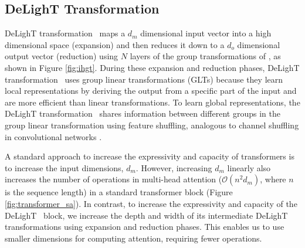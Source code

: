 \subsection{DeLighT Transformation}
\label{ssec:dextra}
DeLighT transformation ~maps a  $d_m$ dimensional input vector into a high dimensional space (expansion) and then reduces it down to a  $d_o$ dimensional output vector (reduction) using  $N$ layers of the group transformations of \citet{mehta2018pyramidal}, as shown in Figure \ref{fig:ihgt}. During these expansion and reduction phases, DeLighT transformation ~uses group linear transformations (GLTs) because they learn local representations by deriving the output from a specific part of the input and are more efficient than linear transformations. To learn global representations, the DeLighT transformation ~shares information between different groups in the group linear transformation using feature shuffling, analogous to channel shuffling in convolutional networks \citep{zhang2018shufflenet}. 

A standard approach to increase the expressivity and capacity of transformers is to increase the input dimensions, $d_m$. However, increasing $d_m$ linearly also increases the number of operations in multi-head attention ($\mathcal{O}(n^2 d_m)$, where $n$ is the sequence length) in a standard transformer block (Figure \ref{fig:transformer_sa}). In contrast, to increase the expressivity and capacity of the DeLighT ~block, we increase the depth and width of its intermediate DeLighT ~ transformations using expansion and reduction phases. This enables us to use smaller dimensions for computing attention, requiring fewer operations. 

